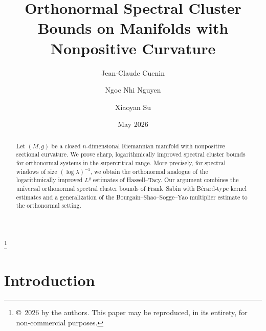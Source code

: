 \documentclass[12pt,reqno,a4paper]{amsart}
\begin{document}
\title[{Orthonormal Spectral Cluster Bounds in Nonpositive Curvature}]{Orthonormal Spectral Cluster Bounds on Manifolds with Nonpositive Curvature}

\author{Jean-Claude Cuenin}
\address[Jean-Claude Cuenin]{Department of Mathematical Sciences, Loughborough University, Loughborough, Leicestershire, LE11 3TU United Kingdom}

\author{Ngoc Nhi Nguyen}
\address[Ngoc Nhi Nguyen]{Laboratoire Paul Painlevé UMR 8524 et équipe projet INRIA PARADYSE, Université de Lille, Cité Scientifique, F-59655 Villeneuve d'Ascq Cedex, France}

\author{Xiaoyan Su}
\address[Xiaoyan Su]{Department of Mathematical Sciences, Loughborough University, Loughborough, Leicestershire, LE11 3TU United Kingdom}



\date{May 2026}

\thanks{\copyright\, 2026 by the authors. This paper may be reproduced, in its entirety, for non-commercial purposes.}


\begin{abstract}
Let \((M,g)\) be a closed \(n\)-dimensional Riemannian manifold with nonpositive sectional curvature. We prove sharp, logarithmically improved spectral cluster bounds for orthonormal systems in the supercritical range. More precisely, for spectral windows of size \((\log \lambda)^{-1}\), we obtain the orthonormal analogue of the logarithmically improved \(L^q\) estimates of Hassell--Tacy. Our argument combines the universal orthonormal spectral cluster bounds of Frank--Sabin with Bérard-type kernel estimates and a generalization of the Bourgain--Shao--Sogge--Yao multiplier estimate to the orthonormal setting.
\end{abstract}


\maketitle

\section{Introduction}
\end{document}
